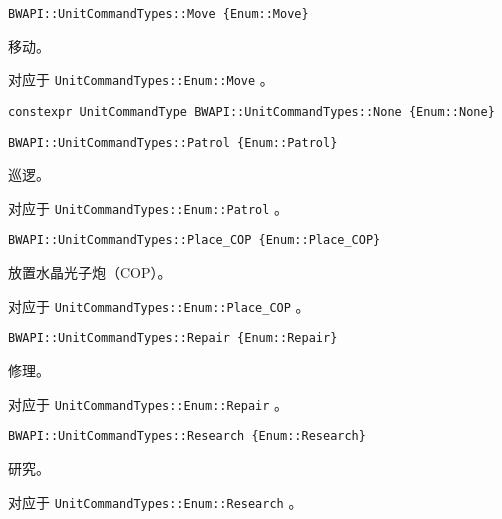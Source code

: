 \begin{tcolorbox}[colback=white, colframe=black!60!white, title=Move\{\}, arc=0mm]
\begin{verbatim}
BWAPI::UnitCommandTypes::Move {Enum::Move}
\end{verbatim}
移动。\par 对应于   \verb|UnitCommandTypes::Enum::Move|  。
\end{tcolorbox}


\begin{tcolorbox}[colback=white, colframe=black!60!white, title=None\{\}, arc=0mm]
\begin{verbatim}
constexpr UnitCommandType BWAPI::UnitCommandTypes::None {Enum::None}
\end{verbatim}
\end{tcolorbox}


\begin{tcolorbox}[colback=white, colframe=black!60!white, title=Patrol\{\}, arc=0mm]
\begin{verbatim}
BWAPI::UnitCommandTypes::Patrol {Enum::Patrol}
\end{verbatim}
巡逻。\par 对应于   \verb|UnitCommandTypes::Enum::Patrol|  。
\end{tcolorbox}


\begin{tcolorbox}[colback=white, colframe=black!60!white, title=Place\_COP\{\}, arc=0mm]
\begin{verbatim}
BWAPI::UnitCommandTypes::Place_COP {Enum::Place_COP}
\end{verbatim}
放置水晶光子炮（COP）。\par 对应于   \verb|UnitCommandTypes::Enum::Place_COP|  。
\end{tcolorbox}


\begin{tcolorbox}[colback=white, colframe=black!60!white, title=Repair\{\}, arc=0mm]
\begin{verbatim}
BWAPI::UnitCommandTypes::Repair {Enum::Repair}
\end{verbatim}
修理。\par 对应于   \verb|UnitCommandTypes::Enum::Repair|  。
\end{tcolorbox}


\begin{tcolorbox}[colback=white, colframe=black!60!white, title=Research\{\}, arc=0mm]
\begin{verbatim}
BWAPI::UnitCommandTypes::Research {Enum::Research}
\end{verbatim}
研究。\par 对应于   \verb|UnitCommandTypes::Enum::Research|  。
\end{tcolorbox}


